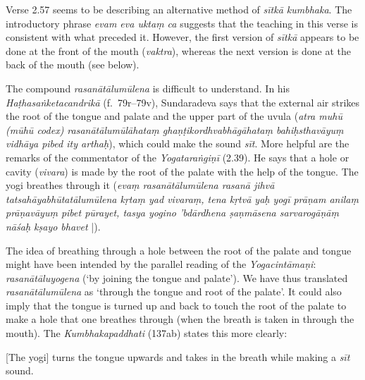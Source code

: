 \begin{ekdosis}
\begin{testimonia}[hp02_057]
\begin{versinnote}
\end{versinnote}
\end{testimonia}

\begin{philcomm}[hp02_057]
Verse 2.57 seems to be describing an alternative method of \emph{sītkā kumbhaka}. The introductory phrase \emph{evam eva uktaṃ ca} suggests that the teaching in this verse is consistent with what preceded it. However, the first version of \emph{sītkā} appears to be done at the front of the mouth (\emph{vaktra}), whereas the next version is done at the back of the mouth (see below).%

The compound \emph{rasanātālumūlena} is difficult to understand. In his \emph{Haṭhasaṅketacandrikā} (f.~79r–79v), Sundaradeva says that the external air strikes the root of the tongue and palate and the upper part of the uvula (\emph{atra muhū (mūhū codex) rasanātālumūlāhataṃ ghaṇṭikordhvabhāgāhataṃ bahiḥsthavāyuṃ vidhāya pibed ity arthaḥ}), which could make the sound \emph{sīt}. More helpful are the remarks of the commentator of the \emph{Yogataraṅgiṇī} (2.39). He says that a hole or cavity (\emph{vivara}) is made by the root of the palate with the help of the tongue. The yogi breathes through it (\emph{evaṃ rasanātālumūlena rasanā jihvā tatsahāyabhūtatālumūlena kṛtaṃ yad vivaraṃ, tena kṛtvā yaḥ yogī prāṇam anilaṃ prāṇavāyuṃ pibet pūrayet, tasya yogino ’bdārdhena ṣaṇmāsena sarvarogāṇāṃ nāśaḥ kṣayo bhavet} |).

The idea of breathing through a hole between the root of the palate and tongue might have been intended by the parallel reading of the \emph{Yogacintāmaṇi}: \emph{rasanā\-tālu\-yogena} (‘by joining the tongue and palate'). We have thus translated \emph{rasanā\-tālu\-mūlena} as ‘through the tongue and root of the palate’. It could also imply that the tongue is turned up and back to touch the root of the palate to make a hole that one breathes through (when the breath is taken in through the mouth). The \emph{Kumbhaka\-paddhati} (137ab) states this more clearly:

\begin{versinnote}
{}[The yogi] turns the tongue upwards and takes in the breath while making a \emph{sīt} sound.\\ 
\end{versinnote}


\end{philcomm}
\end{ekdosis}
